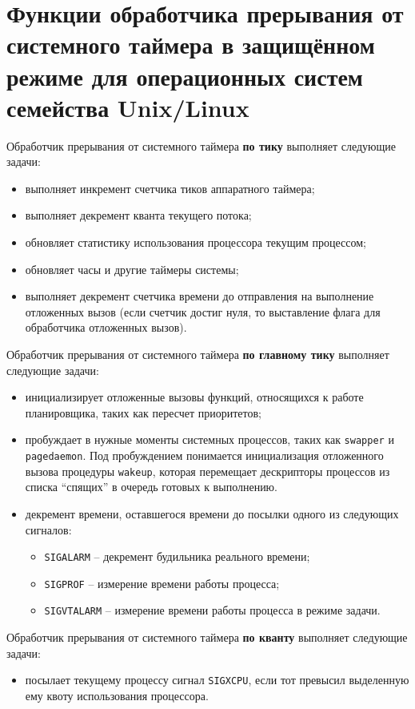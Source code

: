 \chapter{Функции обработчика прерывания от системного таймера в защищённом режиме для операционных систем семейства Unix/Linux}

Обработчик прерывания от системного таймера \textbf{по тику} выполняет следующие задачи:
\begin{itemize}
    \item выполняет инкремент счетчика тиков аппаратного таймера;
    \item выполняет декремент кванта текущего потока;
    \item обновляет статистику использования процессора текущим процессом;
    \item обновляет часы и другие таймеры системы;
    \item выполняет декремент счетчика времени до отправления на выполнение отложенных вызов (если счетчик достиг нуля, то выставление флага для обработчика отложенных вызов).
\end{itemize}

Обработчик прерывания от системного таймера \textbf{по главному тику} выполняет следующие задачи:
\begin{itemize}
    \item инициализирует отложенные вызовы функций, относящихся к работе планировщика, таких как пересчет приоритетов;
    \item пробуждает в нужные моменты системных процессов, таких как \texttt{swapper} и \texttt{pagedaemon}.
        Под пробуждением понимается инициализация отложенного вызова процедуры \texttt{wakeup}, которая перемещает дескрипторы процессов из списка ``спящих'' в очередь готовых к выполнению.
    \item декремент времени, оставшегося времени до посылки одного из следующих сигналов:
        \begin{itemize}
            \item \texttt{SIGALARM} – декремент будильника реального времени;
            \item \texttt{SIGPROF} – измерение времени работы процесса;
            \item \texttt{SIGVTALARM} – измерение времени работы процесса в режиме задачи.
        \end{itemize}
\end{itemize}

Обработчик прерывания от системного таймера \textbf{по кванту} выполняет следующие задачи:
\begin{itemize}
    \item посылает текущему процессу сигнал \texttt{SIGXCPU}, если тот превысил выделенную ему квоту использования процессора.
\end{itemize}


